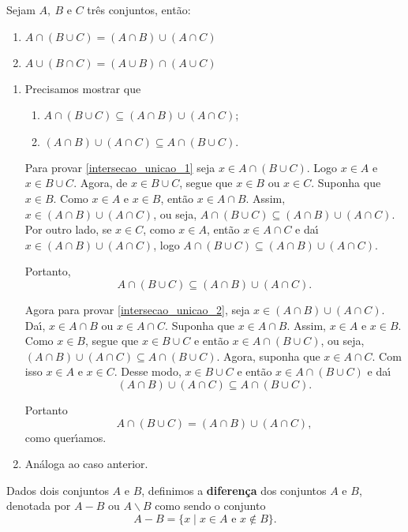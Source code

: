\begin{proposicao} Sejam $A,\ B$ e $C$ tr{\^e}s conjuntos, ent{\~a}o:
\begin{enumerate}
\item $A\cap(B\cup C)=(A\cap B)\cup(A\cap C)$
\item $A\cup(B\cap C)=(A\cup B)\cap(A\cup C)$
\end{enumerate}
\end{proposicao}
\begin{prova}
\begin{enumerate}
\item Precisamos mostrar que
\begin{enumerate}[label={\roman*})]
\item $A\cap(B\cup C)\subseteq(A\cap B)\cup(A\cap C)$;\label{intersecao_unicao_1}
\item $(A\cap B)\cup(A\cap C)\subseteq A\cap(B\cup C).$\label{intersecao_unicao_2}
\end{enumerate}

Para provar \ref{intersecao_unicao_1} seja $x\in A \cap (B \cup C)$. Logo $x\in A$ e $x\in B\cup C$. Agora, de $x\in B\cup C$, segue que $x\in B$ ou $x\in C$. Suponha que $x\in B$. Como $x\in A$ e $x \in B$, ent\~ao $x\in A\cap B$. Assim, $x\in(A\cap B)\cup(A\cap C)$, ou seja, $A\cap(B\cup C)\subseteq(A\cap B)\cup(A\cap C)$. Por outro lado, se $x\in C$, como $x\in A$, ent{\~a}o $x\in A\cap C$ e da{\'\i} $x\in(A\cap B)\cup(A\cap C)$, logo $A\cap(B\cup C)\subseteq(A\cap B)\cup(A\cap C)$.

Portanto,
\[
	A\cap(B\cup C)\subseteq(A\cap B)\cup(A\cap C).
\]

Agora para provar \ref{intersecao_unicao_2}, seja $x\in(A\cap B)\cup(A\cap C)$. Da{\'\i}, $x\in A\cap B$ ou $x\in A\cap C$. Suponha que $x\in A\cap B$. Assim, $x\in A$ e $x\in B$. Como $x\in B$, segue que $x\in B\cup C$ e ent{\~a}o $x\in A\cap(B\cup C)$, ou seja, $(A\cap B)\cup(A\cap C)\subseteq A\cap(B\cup C)$. Agora, suponha que $x\in A\cap C$. Com isso $x\in A$ e $x\in C$. Desse modo, $x\in B\cup C$ e ent{\~a}o $x\in A\cap(B\cup C)$ e da{\'\i}
\[
	(A\cap B)\cup(A\cap C)\subseteq A\cap(B\cup C).
\]

Portanto
\[
	A\cap(B\cup C)=(A\cap B)\cup(A\cap C),
\]
como quer{\'\i}amos.
\item An\'aloga ao caso anterior.
\end{enumerate}
\end{prova}

\begin{definicao}
Dados dois conjuntos $A$ e $B$, definimos a \textbf{diferen{\c c}a} dos conjuntos $A$ e $B$, denotada por $A-B$ ou $A\backslash B$ como sendo o conjunto
\[
A - B = \{x \mid x \in A \mbox{ e } x \notin B\}.
\]
\end{definicao}

